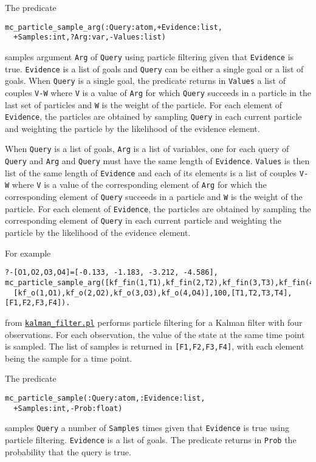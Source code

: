 The predicate
\begin{verbatim}
mc_particle_sample_arg(:Query:atom,+Evidence:list,
  +Samples:int,?Arg:var,-Values:list)
\end{verbatim}
samples argument \verb|Arg| of \verb|Query| using particle filtering
given that
\verb|Evidence|
is true. \verb|Evidence| is a list of goals and \verb|Query| can be either
a single goal or a list of goals.
When \verb|Query| is a single goal, the predicate returns in \verb|Values| a list of couples \verb|V-W| where
\verb|V| is a value of \verb|Arg| for which \verb|Query| succeeds in
a particle in the last set of particles and \verb|W| is the weight of the particle.
For each element of \verb|Evidence|, the particles are obtained by sampling \verb|Query|
in each current particle and weighting the particle by the likelihood of the evidence element.

When \verb|Query| is a list of goals,  \verb|Arg| is a list of variables, one for
each query of \verb|Query| and \verb|Arg| and \verb|Query| must have the same length of \verb|Evidence|.
\verb|Values| is then list of the same length of \verb|Evidence| and each of its
elements is a list of couples \verb|V-W| where
\verb|V| is a value of the corresponding element of \verb|Arg| for which the corresponding element of
\verb|Query| succeeds in
a particle and \verb|W| is the weight of the particle.
For each element of \verb|Evidence|, the particles are obtained by sampling the corresponding element of \verb|Query|
in each current particle and weighting the particle by the likelihood of the evidence element.


For example
\begin{verbatim}
?-[O1,O2,O3,O4]=[-0.133, -1.183, -3.212, -4.586],
mc_particle_sample_arg([kf_fin(1,T1),kf_fin(2,T2),kf_fin(3,T3),kf_fin(4,T4)],
  [kf_o(1,O1),kf_o(2,O2),kf_o(3,O3),kf_o(4,O4)],100,[T1,T2,T3,T4],[F1,F2,F3,F4]).
\end{verbatim}
from \href{http://cplint.ml.unife.it/example/inference/kalman_filter.pl}{\texttt{kalman\_filter.pl}} performs
particle filtering for a Kalman filter with four observations. For each observation, the value of the state
at the same time point is sampled. The list of samples is returned in \verb|[F1,F2,F3,F4]|, with each element
being the sample for a time point.

The predicate
\begin{verbatim}
mc_particle_sample(:Query:atom,:Evidence:list,
  +Samples:int,-Prob:float)
\end{verbatim}
samples \verb|Query|  a number of \verb|Samples| times given that
\verb|Evidence|
is true using particle filtering. \verb|Evidence| is a list of goals.
The predicate returns in \verb|Prob| the probability that the query is true.


